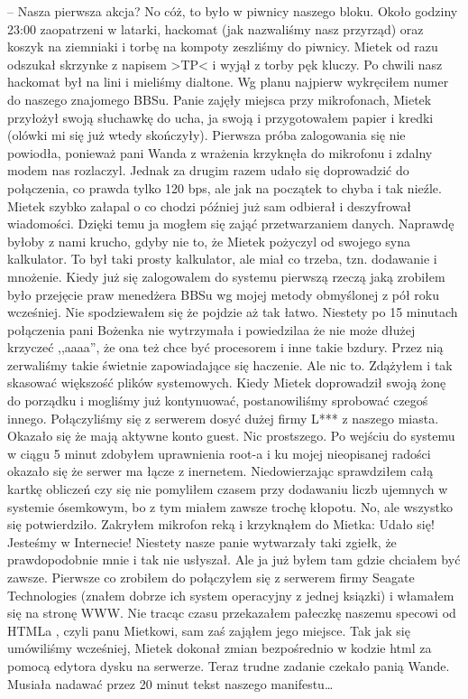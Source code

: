 \documentclass[a4paper,polish,titlepage,12pt]{article}
\begin{document}
-- Nasza pierwsza akcja? No cóż, to było w piwnicy naszego bloku. Około godziny 23:00 zaopatrzeni w latarki, hackomat (jak nazwaliśmy nasz przyrząd) oraz koszyk na ziemniaki 
i torbę na kompoty zeszliśmy do piwnicy. Mietek od razu odszukał skrzynke z napisem >TP< i wyjął z torby pęk kluczy. Po chwili nasz hackomat był na lini i mieliśmy dialtone.
Wg planu najpierw wykręciłem numer do naszego znajomego BBSu. Panie zajęły miejsca przy mikrofonach, Mietek przyłożył swoją słuchawkę do ucha, ja swoją i przygotowałem papier 
i kredki (olówki mi się już wtedy skończyły). Pierwsza próba zalogowania się nie powiodła, ponieważ pani Wanda z wrażenia krzyknęła do mikrofonu i zdalny modem nas rozlaczyl. 
Jednak za drugim razem udało się doprowadzić do połączenia, co prawda tylko 120 bps, ale jak na początek to chyba i tak nieźle. Mietek szybko załapal o co chodzi później już 
sam odbierał i deszyfrował wiadomości. Dzięki temu ja mogłem się zająć przetwarzaniem danych. Naprawdę byłoby z nami krucho, gdyby nie to, że Mietek pożyczyl od swojego syna 
kalkulator. To był taki prosty kalkulator, ale miał co trzeba, tzn. dodawanie i mnożenie. Kiedy już się zalogowalem do systemu pierwszą rzeczą jaką zrobiłem było przejęcie 
praw menedżera BBSu wg mojej metody obmyślonej z pół roku wcześniej. Nie spodziewałem się że pojdzie aż tak łatwo. Niestety po 15 minutach połączenia pani Bożenka nie 
wytrzymała i powiedzilaa że nie może dłużej krzyczeć ,,aaaa'', że ona też chce być procesorem i inne takie bzdury. Przez nią zerwaliśmy takie świetnie zapowiadające się 
haczenie. Ale nic to. Zdążyłem i tak skasować większość plików systemowych. Kiedy Mietek doprowadził swoją żonę do porządku i mogliśmy już kontynuować, postanowiliśmy 
sprobować czegoś innego. Połączyliśmy się z serwerem dosyć dużej firmy L*** z naszego miasta. Okazało się że mają aktywne konto guest. Nic prostszego. Po wejściu do systemu w 
ciągu 5 minut zdobyłem uprawnienia root-a i ku mojej nieopisanej radości okazało się że serwer ma łącze z inernetem. Niedowierzając sprawdziłem całą kartkę obliczeń czy się 
nie pomyliłem czasem przy dodawaniu liczb ujemnych w systemie ósemkowym, bo z tym miałem zawsze trochę kłopotu. No, ale wszystko się potwierdziło. Zakryłem mikrofon reką i 
krzyknąłem do Mietka: Udało się! Jesteśmy w Internecie! Niestety nasze panie wytwarzały taki zgiełk, że prawdopodobnie mnie i tak nie usłyszał. Ale ja już byłem tam gdzie 
chciałem być zawsze. Pierwsze co zrobiłem do połączyłem się z serwerem firmy Seagate Technologies (znałem dobrze ich system operacyjny z jednej ksiązki) i włamałem się na 
stronę WWW. Nie tracąc czasu przekazałem pałeczkę naszemu specowi od HTMLa , czyli panu Mietkowi, sam zaś zająłem jego miejsce. Tak jak się umówiliśmy wcześniej, Mietek 
dokonał zmian bezpośrednio w kodzie html za pomocą edytora dysku na serwerze. Teraz trudne zadanie czekało panią Wande. Musiała nadawać przez 20 minut tekst naszego manifestu\dots
\end{document}
